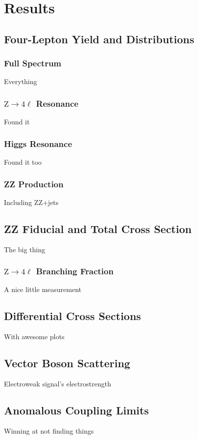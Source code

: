 
\chapter{Results}

\section{Four-Lepton Yield and Distributions}

\subsection{Full Spectrum}
Everything


\subsection{\texorpdfstring{$\mathrm{Z} \to 4\ell$}{Z to 4l} Resonance}
Found it


\subsection{Higgs Resonance}
Found it too


\subsection{ZZ Production}
Including ZZ+jets



\section{ZZ Fiducial and Total Cross Section}
The big thing

\subsection{\texorpdfstring{$\mathrm{Z} \to 4\ell$}{Z to 4l} Branching  Fraction}
A nice little measurement



\section{Differential Cross Sections}
With awesome plots



\section{Vector Boson Scattering}
Electroweak signal's electrostrength



\section{Anomalous Coupling Limits}
Winning at not finding things
